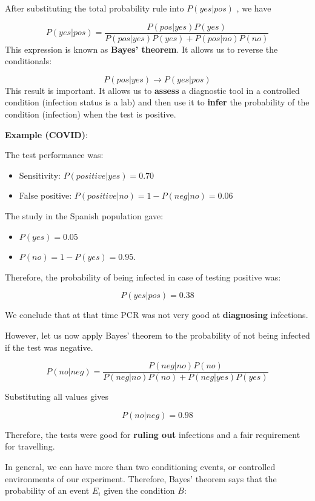 \documentclass[
]{book}
\providecommand{\tightlist}{%
  \setlength{\itemsep}{0pt}\setlength{\parskip}{0pt}}
\begin{document}
After substituting the total probability rule into \(P(yes| pos)\) , we have

\[P(yes| pos)= \frac{P(pos|yes)P(yes)}{P(pos|yes)P(yes)+P(pos|no)P(no)}\]
This expression is known as \textbf{Bayes' theorem}. It allows us to reverse the conditionals:

\[P(pos|yes) \rightarrow P(yes| pos)\]
This result is important. It allows us to \textbf{assess} a diagnostic tool in a controlled condition (infection status is a lab) and then use it to \textbf{infer} the probability of the condition (infection) when the test is positive.

\textbf{Example (COVID)}:

The test performance was:

\begin{itemize}
\item
  Sensitivity: \(P(positive| yes)= 0.70\)
\item
  False positive: \(P(positive| no)= 1- P(neg|no)=0.06\)
\end{itemize}

The study in the Spanish population gave:

\begin{itemize}
\tightlist
\item
  \(P(yes)=0.05\)
\item
  \(P(no)=1-P(yes)=0.95\).
\end{itemize}

Therefore, the probability of being infected in case of testing positive was:

\[P(yes| pos)= 0.38\]

We conclude that at that time PCR was not very good at \textbf{diagnosing} infections.

However, let us now apply Bayes' theorem to the probability of not being infected if the test was negative.

\[P(no|neg) = \frac{P(neg|no) P(no )}{ P(neg|no) P(no)+P(neg|yes)P(yes)}\]

Substituting all values gives

\[P(no| neg)= 0.98\]

Therefore, the tests were good for \textbf{ruling out} infections and a fair requirement for travelling.

In general, we can have more than two conditioning events, or controlled environments of our experiment. Therefore, Bayes' theorem says that the probability of an event \(E_i\) given the condition \(B\):
\end{document}
